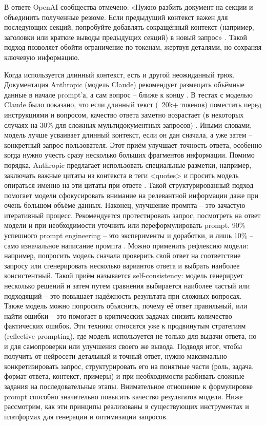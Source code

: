 В ответе OpenAI сообщества отмечено: «Нужно разбить документ на секции и объединить полученные резюме. Если предыдущий контекст важен для последующих секций, попробуйте добавлять сокращённый контекст (например, заголовки или краткие выводы предыдущих секций) в новый запрос» \cite{openai:longprompts}. Такой подход позволяет обойти ограничение по токенам, жертвуя деталями, но сохраняя ключевую информацию.


Когда используется длинный контекст, есть и другой неожиданный трюк. Документация Anthropic (модель Claude) рекомендует размещать объёмные данные в начале prompt’а, а сам вопрос – ближе к концу \cite{willison:longcontext}. В тестах с моделью Claude было показано, что если длинный текст (~20k+ токенов) поместить перед инструкциями и вопросом, качество ответа заметно возрастает (в некоторых случаях на 30\% для сложных мультидокументных запросов) \cite{willison:longcontext}. Иными словами, модель лучше усваивает длинный контекст, если он дан сначала, а уже затем – конкретный запрос пользователя. Этот приём улучшает точность ответа, особенно когда нужно учесть сразу несколько больших фрагментов информации. Помимо порядка, Anthropic предлагает использовать специальные разметки, например, заключать важные цитаты из контекста в теги <quotes> и просить модель опираться именно на эти цитаты при ответе \cite{willison:longcontext}. Такой структурированный подход помогает модели сфокусировать внимание на релевантной информации даже при очень большом объёме данных. Наконец, улучшение промпта – это зачастую итеративный процесс. Рекомендуется протестировать запрос, посмотреть на ответ модели и при необходимости уточнить или переформулировать prompt. 90\% успешного prompt engineering – это эксперименты и доработки, и лишь 10\% – само изначальное написание промпта \cite{reddit:prompteng}. Можно применить рефлексию модели: например, попросить модель сначала проверить свой ответ на соответствие запросу или сгенерировать несколько вариантов ответа и выбрать наиболее консистентный. Такой приём называется self-consistency: модель генерирует несколько решений и затем путем сравнения выбирается наиболее частый или подходящий – это повышает надёжность результата при сложных вопросах. Также модель можно попросить объяснить, почему её ответ правильный, или найти ошибки – это помогает в критических задачах снизить количество фактических ошибок\cite{lakera:2025}. Эти техники относятся уже к продвинутым стратегиям (reflective prompting), где модель используется не только для выдачи ответа, но и для самопроверки или улучшения своего же вывода\cite{restack:advprompt}. Подводя итог, чтобы получить от нейросети детальный и точный ответ, нужно максимально конкретизировать запрос, структурировать его на понятные части (роль, задача, формат ответа, контекст, примеры) и при необходимости разбивать сложные задания на последовательные этапы. Внимательное отношение к формулировке prompt способно значительно повысить качество результатов модели\cite{lakera:2025}.
Ниже рассмотрим, как эти принципы реализованы в существующих инструментах и платформах для генерации и оптимизации запросов.

